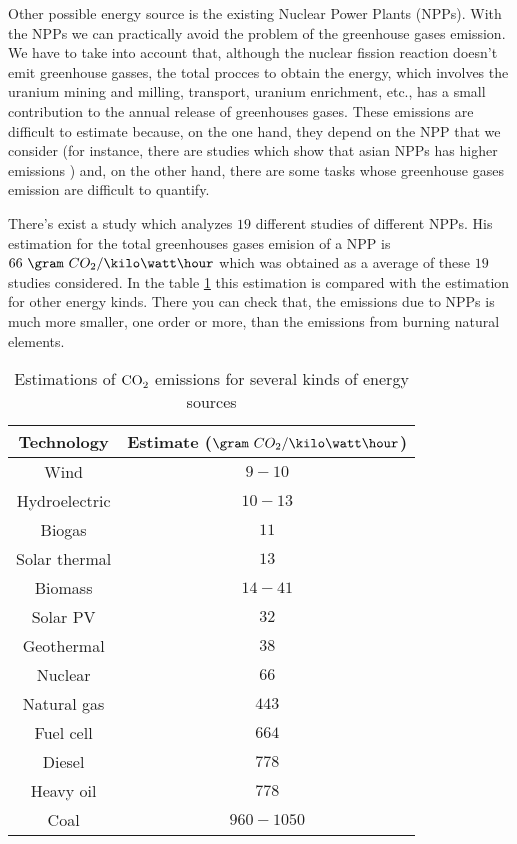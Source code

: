Other possible  energy source is the existing Nuclear Power Plants (NPPs). With the NPPs we can practically avoid the problem of the greenhouse gases emission. We have to take into account that, although the nuclear fission reaction doesn't emit greenhouse gasses, the total procces to obtain the energy, which involves the uranium mining and milling, transport, uranium enrichment, etc., has a small contribution to the annual release of greenhouses gases. These emissions are difficult to estimate because, on the one hand, they depend on the NPP that we consider (for instance, there are studies which show that asian NPPs has higher emissions \cite{ComparationEmissions}) and, on the other hand, there are some tasks whose greenhouse gases emission are difficult to quantify\cite{ComparationEmissions}. 

There's exist a study \cite{ComparationEmissions} which analyzes $19$ different studies of different NPPs. His estimation for the total greenhouses gases emision of a NPP is $66~\gram~CO_2 /\kilo\watt\hour$ which was obtained as a average of these $19$ studies considered. In the table \ref{tab:ComparationEmisions} this estimation is compared with the estimation for other energy kinds. There you can check that, the emissions due to NPPs is much more smaller, one order or more, than the emissions from burning natural elements.

\begin{table}[htbp]
\begin{center}
\begin{tabular}{|c|c|}
\hline
Technology & Estimate ($\gram~CO_2 /\kilo\watt\hour$)\\
\hline \hline
Wind & $9-10$ \\ \hline
Hydroelectric & $10-13$ \\ \hline
Biogas & $11$ \\ \hline
Solar thermal & $13$ \\ \hline
Biomass & $14-41$ \\ \hline
Solar PV & $32$ \\ \hline
Geothermal & $38$ \\ \hline
Nuclear & $66$ \\ \hline
Natural gas & $443$ \\ \hline
Fuel cell & $664$ \\ \hline
Diesel & $778$ \\ \hline
Heavy oil & $778$ \\ \hline
Coal & $960-1050$ \\ \hline
\end{tabular}
\caption{Estimations of $\ce{CO_2}$ emissions for several kinds of energy sources\cite{ComparationEmissions}}
\label{tab:ComparationEmisions}
\end{center}
\end{table}

